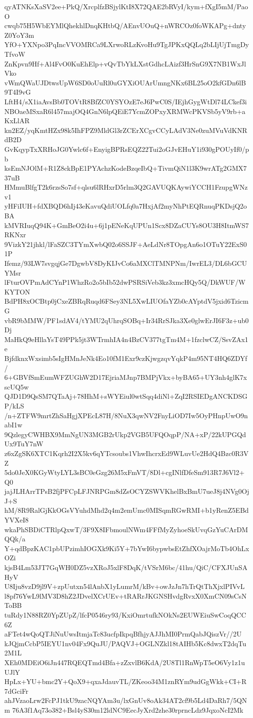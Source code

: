 qyATNKsXaSV2ee+PkQ/XrcplfzBSjylKtI8X72QAE2bRVyI/kym+fXgI5mM/PaoO
cwqb75H5WbEYMlQhekhlDnqKHtbQ/AEnvUOuQ+nWRCOz0foWKAPg+dntyZ0YoY3m
YfO+YXNpo3PqIncVVOMRCa9LXrwoRLzKvoHu9TgJPKxQQLq2bLIjUjTmgDyTfvoW
ZnKpvn9Hf+Al4FvO0KuEhElp+vQvTbYkLXstGdhcLAizf3HrSnG9X7NB1WxJlVko
vWmQWaUJDtwsUpW6SD0oUuRl0uGYXiOUArUmngNKx6BL25oO2kfGDn6lB9T4I9vG
LftH4/sX1iaAvsBb0TOVtR8BfZC0YSYOzE7eJ6PwC0S/IEjhGygWtDl74LCkef3i
NBOaeMSxaR6l457majOQ4GnN6lpQEiE7YcmZOPxyXRMWcPKVSb5yV9rb+aKxLlAR
kn2EZ/yqKmtHZx98k5IhFPZ9MldGl3rZCErXCgvCCyLAdV3Ne0zuMVuVdKNRdB2D
GvKqypTxXRHoJG0Ywlc6f+EnyigBPRsEQZ22Tui2oGJvEHuY1i930gPOUyIf0/pb
ksEmNJOlM+R1Z8ckBpE1PYAchzKodeBzqeIbQ+TivmQiN1l3K9wrATg2GMX737uB
HMmuBlfgT2k6rzsSo7sf+qlsu6lRHxrD5rlm3Q2GAVUQKAywiYCCH1FzupgWNzv1
yHFiIUH+fdXBQD6hIj43eKavuQdiUOLfq0a7HxjAf2myNhPtEQRnuqPKDsjQ2oBA
kMVRIuqQ94K+GmBeO2i4u+6j1pENeKqUPUn1Scx8DZaCUYs8OU3H8ItmWS7RKNxr
9VizkY21jhkl/lFaSZC3TYmXwbQ02o6SSJF+AeLdNr8TOpgAn6o1OTuY22ExS01P
Ifemz/93LW7svgqjGe7DgwbV8DyKIJvCo6aMXClTMNPNm/IwrEL3/DL6bGCUYMsr
lFturOVPmAdCYnP1WhzRo2o5bIb52dwPSRSiVeb3kz3xmcHQy5Q/DkWUF/WKYTON
BdPH8xOCBtp0jCxeZBRqRuqd6FSey3NL5XwLIUOfaYZb0cAYptdV5jxid6TzicmG
vbR9bMMW/PF1sdAV4/tYMU2qUhrqSOBq+Ir34RrSJka3Xe0glwErJI6F3z+ub0Dj
MaHkQ9eHllaYsT49PPk5jt3WTrmhIA4n4BzCV377tgTm4M+1fzclwCZ/SsvZAx1e
BjfdknxWxsimb5sIgHMnJeNk4Eo10fM1Exr9czKjwgzqvYqkP4m95NT4HQ6ZDYf/
6+GBVfSmEumWFZUGhW2D17EjriaMJnp7BMPjVkx+byBA65+UY3nh4glK7xscUQ5w
QJD1D9QsSM7QTaAj+78HhM+sWYEiul0wtSqq4diNl+ZqI2RSIEDgANCKDSGP/kLS
/n+ZTFW9mrtZhSaHgjXPEcL87H/8NuX3qwNV2FnyLiOD7Iw5OyPHnpUwO9nabI1w
9QzlegyCWHBX9MmNgUN3MGB2rUkp2VGB5UFQOqpP/NA+xP/22kUPGQdUx9TuY7nW
z6xZgSK6XTC1Kqrh2I2X5kv6qYTcsoubs1VhwIhcrxEd9WLuvUe2HdQ4Bzc0R3VZ
5do0JeX0KGyWtyLYL3sBC0eGzg26M5xFmVT/8Dl+cgINlfDfeSm913R7J6Vl2+Q0
jajJLHArrTPsB2fjPFCpLFJNRPGm8dZsOCYZSWVKhelBxBmU7ueJ8j4NVg0OjJ+S
hM/8R9RalGjKkOGsVYuhdMhd2q4m2emUmc0MISqmRGwRMI+b1yRenZ5EBdYVXeI8
wkaPhSBDiCTRlpQxwT/3F9X8IFbmoulNWm4FFfMyZyhoeSkUvqGzYuCArDMQQk/a
Y+qdBpzKAC1pbUPzimhIOGXk9Ki5Y+7bYwI6bypwbsEtZhfXOajrMoTb4OhLxOZi
kjsB4Lm53JT7GqWH0DZ5vzXRoJ5xlF8DqK/tVSrM6bc/41hu/QiC/CFXJUnSAHyV
U8Iju8vzD9jl9V+zpUutxn54lAnbX1yLumrM/kBv+owJzJn7hTrQtThXjxlPIVvL
l8pf76YwL9lMV3D8hZ2JDvelXCrUEv+tRARrJKGNSHvdgRvxX0XmCN09sCsNToBB
tuRdy1N88RZ0YpZUpZ/lfcP0546ry93/KxiOmrtufkNOkNs2EUWEiuSwCoqQCC6Z
aFTet4wQoQTJiNuUwsItmjaTc83ucfpIkpqBfhjyAJJhMI0PrmQabJQiszVr//2U
kJQjmCcbP5IEYU1nv04Fx9QuJU/PAQVJ+OGLNZkl18tAIHb5Kc8dwxT2dqTu2M1L
XEh0MDEiO6iJn447RQEQTmd4Bfa+zZxvlB6KdA/2U8Tl1RnWpT5eO6Vy1z1uUJlY
HpLx+YU+bmc2Y+QoX9+qxaJdauvTL/ZKeoo34M1znRYm9udGgWkk+CI+R7dGciFr
ahJVzaoLrw2FcPJ1tkU9zacNQYAm3u/lxGnUv8oAk34AT2cf9b5Ld4DaRh7/5QNm
76A3f1Aq73o382+Bsl4yS30m12ldNC9EecJyXrd2zhe30rprncLdz9JqxoNcI2Mk
